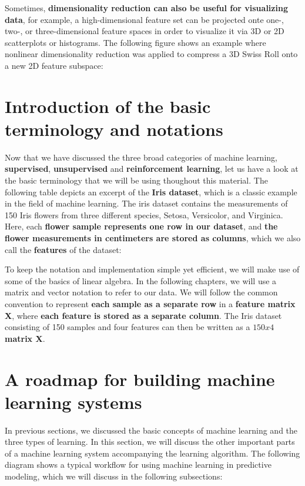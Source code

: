 \documentclass[11pt]{article}
\begin{document}
    Sometimes, \textbf{dimensionality reduction can also be useful for
visualizing data}, for example, a high-dimensional feature set can be
projected onte one-, two-, or three-dimensional feature spaces in order
to visualize it via 3D or 2D scatterplots or histograms. The following
figure shows an example where nonlinear dimensionality reduction was
applied to compress a 3D Swiss Roll onto a new 2D feature subspace:

    

    \section{Introduction of the basic terminology and
notations}\label{introduction-of-the-basic-terminology-and-notations}

    Now that we have discussed the three broad categories of machine
learning, \textbf{supervised}, \textbf{unsupervised} and
\textbf{reinforcement learning}, let us have a look at the basic
terminology that we will be using thoughout this material. The following
table depicts an excerpt of the \textbf{Iris dataset}, which is a
classic example in the field of machine learning. The iris dataset
contains the measurements of 150 Iris flowers from three different
species, Setosa, Versicolor, and Virginica. Here, each \textbf{flower
sample represents one row in our dataset}, and \textbf{the flower
measurements in centimeters are stored as columns}, which we also call
the \textbf{features} of the dataset:

    

    To keep the notation and implementation simple yet efficient, we will
make use of some of the basics of linear algebra. In the following
chapters, we will use a matrix and vector notation to refer to our data.
We will follow the common convention to represent \textbf{each sample as
a separate row} in a \textbf{feature matrix X}, where \textbf{each
feature is stored as a separate column}. The Iris dataset consisting of
150 samples and four features can then be written as a \textbf{\(150x4\)
matrix X}.

    \section{A roadmap for building machine learning
systems}\label{a-roadmap-for-building-machine-learning-systems}

    In previous sections, we discussed the basic concepts of machine
learning and the three types of learning. In this section, we will
discuss the other important parts of a machine learning system
accompanying the learning algorithm. The following diagram shows a
typical workflow for using machine learning in predictive modeling,
which we will discuss in the following subsections:
\end{document}

